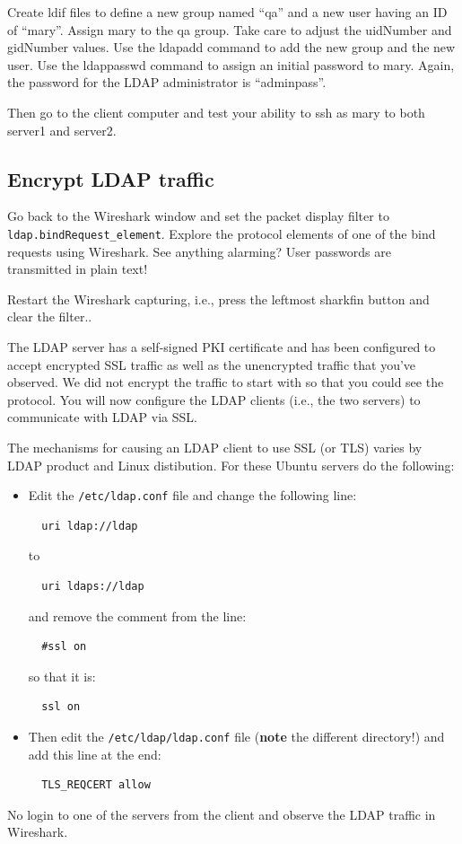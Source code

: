 Create ldif files to define a new group named ``qa'' and a new user having an ID of ``mary''.
Assign mary to the qa group. Take care to adjust the uidNumber and gidNumber values.
Use the ldapadd command to add the new group and the new user.  Use the ldappasswd command to
assign an initial password to mary.  Again, the password for the LDAP administrator is ``adminpass''.

Then go to the client computer and test your ability to ssh as mary to both server1 and server2.

\subsection{Encrypt LDAP traffic}
Go back to the Wireshark window and set the packet display filter to {\tt ldap.bindRequest\_element}.
Explore the protocol elements of one of the bind requests using Wireshark.  See anything alarming?
User passwords are transmitted in plain text!  

Restart the Wireshark capturing, i.e., press the leftmost sharkfin button and clear the filter..

The LDAP server has a self-signed PKI certificate and has been configured to accept encrypted SSL traffic as well as the unencrypted 
traffic that you've observed.  We did not encrypt the traffic to start with so that you could see
the protocol.  You will now configure the LDAP clients (i.e., the two servers) to communicate with
LDAP via SSL.

The mechanisms for causing an LDAP client to use SSL (or TLS) varies by LDAP product and Linux distibution.  For these Ubuntu servers
do the following:

\begin{itemize}
\item Edit the {\tt /etc/ldap.conf} file and change the following line:
\begin{verbatim}
  uri ldap://ldap 
\end{verbatim}
\noindent to
\begin{verbatim}
  uri ldaps://ldap 
\end{verbatim}
\noindent and remove the comment from the line:
\begin{verbatim}
  #ssl on
\end{verbatim}
\noindent so that it is:
\begin{verbatim}
  ssl on
\end{verbatim}
\item Then edit the {\tt /etc/ldap/ldap.conf} file (\textbf{note} the different directory!) and add this line at the end:
\begin{verbatim}
  TLS_REQCERT allow
\end{verbatim}
 
\end{itemize}
No login to one of the servers from the client and observe the LDAP traffic in Wireshark.


